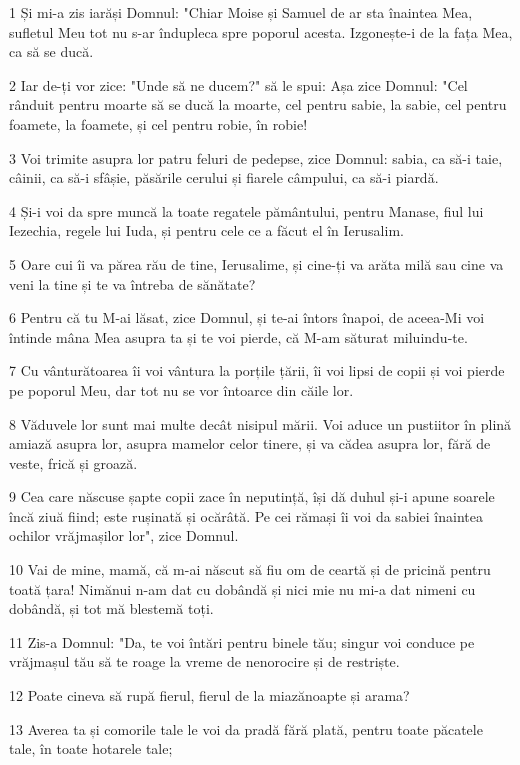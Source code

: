 \par 1 Și mi-a zis iarăși Domnul: "Chiar Moise și Samuel de ar sta înaintea Mea, sufletul Meu tot nu s-ar îndupleca spre poporul acesta. Izgonește-i de la fața Mea, ca să se ducă.
\par 2 Iar de-ți vor zice: "Unde să ne ducem?" să le spui: Așa zice Domnul: "Cel rânduit pentru moarte să se ducă la moarte, cel pentru sabie, la sabie, cel pentru foamete, la foamete, și cel pentru robie, în robie!
\par 3 Voi trimite asupra lor patru feluri de pedepse, zice Domnul: sabia, ca să-i taie, câinii, ca să-i sfâșie, păsările cerului și fiarele câmpului, ca să-i piardă.
\par 4 Și-i voi da spre muncă la toate regatele pământului, pentru Manase, fiul lui Iezechia, regele lui Iuda, și pentru cele ce a făcut el în Ierusalim.
\par 5 Oare cui îi va părea rău de tine, Ierusalime, și cine-ți va arăta milă sau cine va veni la tine și te va întreba de sănătate?
\par 6 Pentru că tu M-ai lăsat, zice Domnul, și te-ai întors înapoi, de aceea-Mi voi întinde mâna Mea asupra ta și te voi pierde, că M-am săturat miluindu-te.
\par 7 Cu vânturătoarea îi voi vântura la porțile țării, îi voi lipsi de copii și voi pierde pe poporul Meu, dar tot nu se vor întoarce din căile lor.
\par 8 Văduvele lor sunt mai multe decât nisipul mării. Voi aduce un pustiitor în plină amiază asupra lor, asupra mamelor celor tinere, și va cădea asupra lor, fără de veste, frică și groază.
\par 9 Cea care născuse șapte copii zace în neputință, își dă duhul și-i apune soarele încă ziuă fiind; este rușinată și ocărâtă. Pe cei rămași îi voi da sabiei înaintea ochilor vrăjmașilor lor", zice Domnul.
\par 10 Vai de mine, mamă, că m-ai născut să fiu om de ceartă și de pricină pentru toată țara! Nimănui n-am dat cu dobândă și nici mie nu mi-a dat nimeni cu dobândă, și tot mă blestemă toți.
\par 11 Zis-a Domnul: "Da, te voi întări pentru binele tău; singur voi conduce pe vrăjmașul tău să te roage la vreme de nenorocire și de restriște.
\par 12 Poate cineva să rupă fierul, fierul de la miazănoapte și arama?
\par 13 Averea ta și comorile tale le voi da pradă fără plată, pentru toate păcatele tale, în toate hotarele tale;
